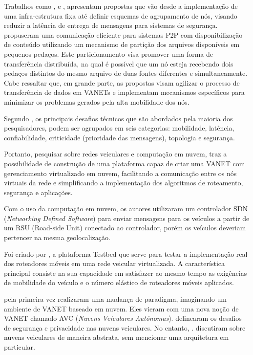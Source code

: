 \documentclass[
	12pt,				%
	oneside,			%
	a4paper,			%
	english,			%
	brazil				%
	]{abntex2ppgsi}
\begin{document}
Trabalhos como  ,  e , apresentam propostas que vão desde a implementação de uma infra-estrutura fixa até definir esquemas de agrupamento de nós, visando reduzir a latência de entrega de mensagens para sistemas de segurança.  propuseram uma comunicação eficiente para sistemas P2P com disponibilização de conteúdo utilizando um mecanismo de partição dos arquivos disponíveis em pequenos pedaços.  Este particionamento visa promover uma forma de transferência distribuída,  na qual é possível que um nó esteja recebendo dois pedaços distintos do mesmo arquivo de duas fontes diferentes e simultaneamente.  Cabe ressaltar que, em grande parte, as propostas visam agilizar o processo de transferência de dados em VANETs e implementam mecanismos específicos para minimizar os problemas gerados pela alta mobilidade dos nós.

Segundo , os principais desafios técnicos que são abordados pela maioria dos pesquisadores, podem ser agrupados em seis categorias: mobilidade, latência, confiabilidade, criticidade (prioridade das mensagens), topologia e segurança. 

Portanto, pesquisar sobre redes veiculares e computação em nuvem, traz a possibilidade de construção de uma plataforma capaz de criar uma VANET com gerenciamento virtualizado em nuvem, facilitando a comunicação entre os nós virtuais da rede e simplificando a implementação dos algoritmos de roteamento, segurança e aplicações.

Com o uso da computação em nuvem, os autores   utilizaram um controlador SDN (\textit{Networking Defined Software}) para enviar mensagens para os veículos a partir de um RSU (Road-side Unit) conectado ao controlador, porém os veículos deveriam pertencer na mesma geolocalização.

Foi criado por , a plataforma Testbed que serve para testar a implementação real dos roteadores móveis em uma rede veicular virtualizada. A característica principal consiste na sua capacidade em satisfazer ao mesmo tempo as exigências de mobilidade do veículo e o número elástico de roteadores móveis aplicados.

 pela primeira vez realizaram uma mudança de paradigma, imaginando um ambiente de VANET baseado em nuvem. Eles vieram com uma nova noção de VANET chamado AVC (\textit{Nuvens Veiculares Autónomas}).   delinearam os desafios de segurança e privacidade nas nuvens veiculares. No entanto, . discutiram sobre nuvens veiculares de maneira abstrata, sem mencionar uma arquitetura em  particular. 
\end{document}
